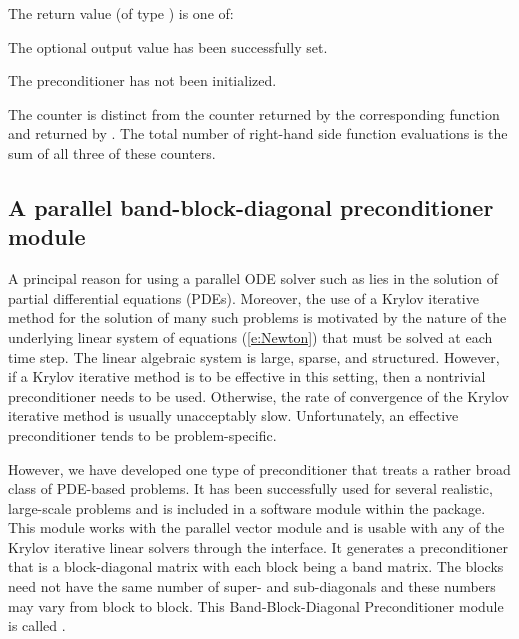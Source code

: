 {
  The return value  (of type ) is one of:
  \begin{args}
  \item[\Id{CVSPILS\_SUCCESS}]
    The optional output value has been successfully set.
  \item[\Id{CVSPILS\_PMEM\_NULL}]
    The {\cvbandpre} preconditioner has not been initialized.
  \end{args}
}
{
The counter  is distinct from the counter 
returned by the corresponding function  and
 returned by .
The total number of right-hand side function evaluations is the
sum of all three of these counters.
}

\subsection{A parallel band-block-diagonal preconditioner module}
\label{sss:cvbbdpre}

A principal reason for using a parallel ODE solver such as {\cvode} lies
in the solution of partial differential equations (PDEs).  Moreover,
the use of a Krylov iterative method for the solution of many such
problems is motivated by the nature of the underlying linear system of
equations (\ref{e:Newton}) that must be solved at each time step.  The
linear algebraic system is large, sparse, and structured. However, if
a Krylov iterative method is to be effective in this setting, then a
nontrivial preconditioner needs to be used.  Otherwise, the rate of
convergence of the Krylov iterative method is usually unacceptably
slow.  Unfortunately, an effective preconditioner tends to be
problem-specific.

However, we have developed one type of preconditioner that treats a
rather broad class of PDE-based problems.  It has been successfully
used for several realistic, large-scale problems \cite{HiTa:98} and is
included in a software module within the {\cvode} package. This module
works with the parallel vector module {\nvecp} and is usable with any of
the Krylov iterative linear solvers through the {\cvspils} interface.
It generates a preconditioner that is a block-diagonal matrix with
each block being a band matrix. The blocks need not have the same
number of super- and sub-diagonals and these numbers may vary from
block to block. This Band-Block-Diagonal Preconditioner module is
called {\cvbbdpre}.


